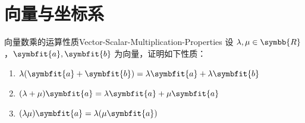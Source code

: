 \section{向量与坐标系}

\begin{problem}{向量数乘的运算性质}{Vector-Scalar-Multiplication-Properties}
    设 $\lambda, \mu \in \symbb{R}$，$\symbfit{a}, \symbfit{b}$ 为向量，证明如下性质：
    \begin{enumerate}
        \item $\lambda(\symbfit{a} + \symbfit{b}) = \lambda\symbfit{a} + \lambda\symbfit{b}$
        \item $(\lambda + \mu)\symbfit{a} = \lambda\symbfit{a} + \mu\symbfit{a}$
        \item $(\lambda\mu)\symbfit{a} = \lambda(\mu\symbfit{a})$
    \end{enumerate}
\end{problem}

